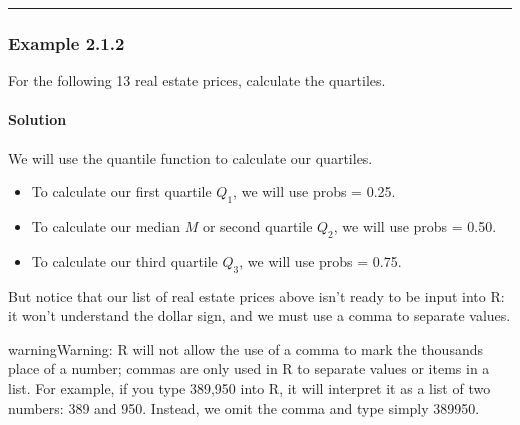 \documentclass[letterpaper,10pt,english]{jupyterBook}
\begin{document}
\bigskip\hrule\bigskip



\subsubsection{Example 2.1.2}
\label{\detokenize{Ch2 Descriptive Statistics/2.1 Measures of Position:example-2-1-2}}
\sphinxAtStartPar
For the following 13 real estate prices, calculate the quartiles.




\paragraph{Solution}
\label{\detokenize{Ch2 Descriptive Statistics/2.1 Measures of Position:id1}}
\sphinxAtStartPar
We will use the quantile function to calculate our quartiles.
\begin{itemize}
\item {} 
\sphinxAtStartPar
To calculate our first quartile \(Q_1\), we will use probs = 0.25.

\item {} 
\sphinxAtStartPar
To calculate our median \(M\) or second quartile \(Q_2\), we will use probs = 0.50.

\item {} 
\sphinxAtStartPar
To calculate our third quartile \(Q_3\), we will use probs = 0.75.

\end{itemize}

\sphinxAtStartPar
But notice that our list of real estate prices above isn’t ready to be input into R: it won’t understand the dollar sign, and we must use a comma to separate values.



\begin{sphinxadmonition}{warning}{Warning:}
\sphinxAtStartPar
R will not allow the use of a comma to mark the thousands place of a number; commas are only used in R to separate values or items in a list. For example, if you type 389,950 into R, it will interpret it as a list of two numbers: 389 and 950. Instead, we omit the comma and type simply 389950.
\end{sphinxadmonition}
\end{document}
